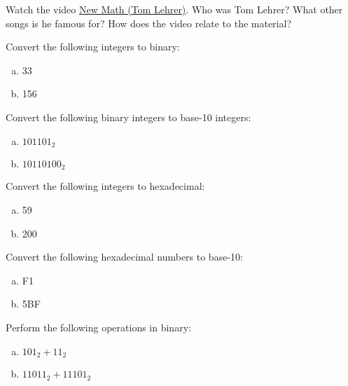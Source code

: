 \documentclass[11pt,letterpaper]{article}
\begin{document}
\homework{}

 Watch the video \href{https://www.youtube.com/watch?v=UIKGV2cTgqA&ab_channel=JaredKhan}{New Math (Tom Lehrer)}. Who was Tom Lehrer? What other songs is he famous for? How does the video relate to the material? \pspace



\newpage



 Convert the following integers to binary:
        \begin{enumerate}[(a)]
        \item 33
        \item 156
        \end{enumerate}



\newpage



 Convert the following binary integers to base-10 integers:
        \begin{enumerate}[(a)]
        \item $101101_2$
        \item $10110100_2$
        \end{enumerate}



\newpage



 Convert the following integers to hexadecimal:
        \begin{enumerate}[(a)]
        \item 59
        \item 200
        \end{enumerate}



\newpage



 Convert the following hexadecimal numbers to base-10:
        \begin{enumerate}[(a)]
        \item F1
        \item 5BF
        \end{enumerate}



\newpage



 Perform the following operations in binary:
        \begin{enumerate}[(a)]
        \item $101_2 + 11_2$
        \item $11011_2 + 11101_2$
        \end{enumerate}
\end{document}
